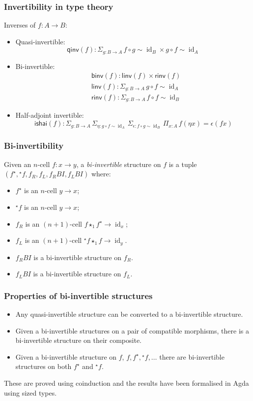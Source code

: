 \documentclass[presentation]{beamer}
\DeclareMathOperator{\id}{id}
\newcommand{\linv}[1]{{}^\star\!#1}
\newcommand{\rinv}[1]{#1^\star}
\newcommand{\comp}{\star}
\begin{document}
\begin{frame}
  \frametitle{Invertibility in type theory}
  Inverses of \(f : A \to B\):
  \begin{itemize}
  \item Quasi-invertible:
    \[ \mathsf{qinv}(f) : \Sigma_{g : B \to A}\,f \circ g \sim \id_B \times g \circ f \sim \id_A\]
  \item Bi-invertible:
    \begin{align*}
      &\mathsf{binv}(f) : \mathsf{linv}(f) \times \mathsf{rinv}(f) \\
      &\mathsf{linv}(f) : \Sigma_{g : B \to A}\,g \circ f \sim \id_A \\
      &\mathsf{rinv}(f) : \Sigma_{g : B \to A}\,f \circ f \sim \id_B
    \end{align*}
  \item Half-adjoint invertible:
    \[ \mathsf{ishai}(f) : \Sigma_{g : B \to A}\,\Sigma_{\eta : g \circ f \sim \id_A}\,\Sigma_{\epsilon : f \circ g \sim \id_B}\,\Pi_{x : A}\,f(\eta x) = \epsilon(f x) \]
  \end{itemize}
\end{frame}

\begin{frame}
  \frametitle{Bi-invertibility}
    Given an \(n\)-cell \(f : x \to y\), a \emph{bi-invertible} structure on \(f\) is a tuple \((\rinv f, \linv f, f_R, f_L, f_R{}BI, f_L{}BI)\) where:
  \begin{itemize}
  \item \(\rinv f\) is an \(n\)-cell \(y \to x\);
  \item \(\linv f\) is an \(n\)-cell \(y \to x\);
  \item \(f_R\) is an \((n+1)\)-cell \(f \comp_1 \rinv f \to \id_x\);
  \item \(f_L\) is an \((n+1)\)-cell \(\linv f \comp_1 f \to \id_y\).
  \item \(f_R{}BI\) is a bi-invertible structure on \(f_R\).
  \item \(f_L{}BI\) is a bi-invertible structure on \(f_L\).
  \end{itemize}
\end{frame}

\begin{frame}
  \frametitle{Properties of bi-invertible structures}
  \begin{itemize}
  \item Any quasi-invertible structure can be converted to a bi-invertible structure.
  \item Given a bi-invertible structures on a pair of compatible morphisms, there is a bi-invertible structure on their composite.
  \item Given a bi-invertible structure on \(f\), \(f, \rinv f, \linv f, \dots\) there are bi-invertible structures on both \(\rinv f\) and \(\linv f\).
  \end{itemize}
  \pause{}
  These are proved using coinduction and the results have been formalised in Agda using sized types.
\end{frame}
\end{document}
